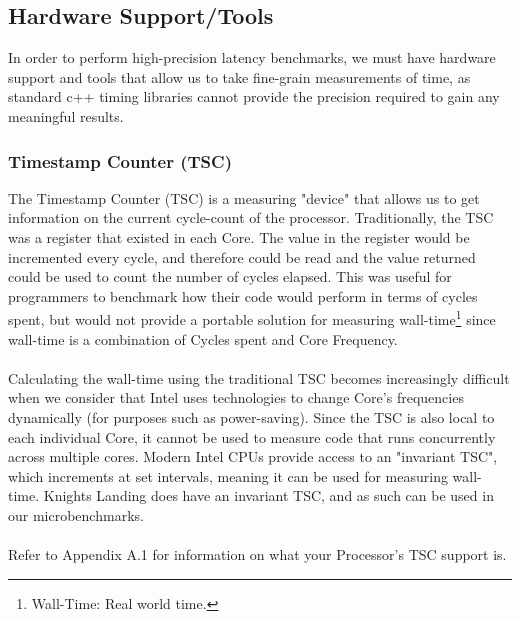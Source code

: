 \documentclass[bsc,frontabs,twoside,singlespacing,parskip,deptreport]{infthesis}     %
\begin{document}
\subsection{Hardware Support/Tools}
In order to perform high-precision latency benchmarks, we must have hardware support and tools that allow us to take fine-grain measurements of time, as standard c++ timing libraries cannot provide the precision required to gain any meaningful results.

\subsubsection{Timestamp Counter (TSC)}
The Timestamp Counter (TSC) is a measuring "device" that allows us to get information on the current cycle-count of the processor. Traditionally, the TSC was a register that existed in each Core. The value in the register would be incremented every cycle, and therefore could be read and the value returned could be used to count the number of cycles elapsed. This was useful for programmers to benchmark how their code would perform in terms of cycles spent, but would not provide a portable solution for measuring wall-time\footnote{Wall-Time: Real world time.} since wall-time is a combination of Cycles spent and Core Frequency. \\
\\
Calculating the wall-time using the traditional TSC becomes increasingly difficult when we consider that Intel uses technologies to change Core's frequencies dynamically (for purposes such as power-saving). Since the TSC is also local to each individual Core, it cannot be used to measure code that runs concurrently across multiple cores. Modern Intel CPUs provide access to an "invariant TSC", which increments at set intervals, meaning it can be used for measuring wall-time. Knights Landing does have an invariant TSC, and as such can be used in our microbenchmarks. \\
\\
Refer to Appendix A.1 for information on what your Processor's TSC support is.
\end{document}
